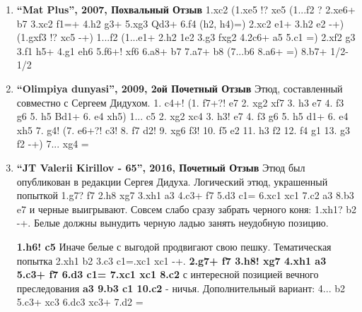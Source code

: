 \begin{enumerate}
\item \textbf{ ``Mat Plus'', 2007, Похвальный Отзыв } 1.\rook{}xc2 (1.\rook{}xe5 !? \rook{}xe5 (1...f2 ? 2.\rook{}xe6+ \king{}b7 3.\rook{}xc2 f1=\queen{}+ 4.\king{}h2 g3+ 5.\king{}xg3 Qd3+ 6.\king{}f4 {(\king{}h2, h4)=}) 2.\rook{}xc2 \rook{}e1+ 3.\king{}h2 \rook{}e2 -+) (1.gxf3 !? \rook{}xc5 -+) 1...f2 (1...\rook{}e1+ 2.\king{}h2 \rook{}1e2 3.\king{}g3 fxg2 4.\rook{}2c6+ \king{}a5 5.\rook{}c1 =) 2.\rook{}xf2 g3 3.\rook{}f1 \rook{}h5+ 4.\king{}g1 \rook{}eh6 5.\rook{}f6+! \rook{}xf6 6.\rook{}a8+ \king{}b7 7.\rook{}a7+ \king{}b8 (7...\king{}b6 8.\rook{}a6+ =) 8.\rook{}b7+ 1/2-1/2

\item \textbf{ ``Olimpiya dunyasi'', 2009, 2ой Почетный Отзыв } Этюд, составленный совместно с Сергеем Дидухом.
1. \knight{}c4+! 
  (1. \knight{}f7+?! \king{}e7 2. \bishop{}xg2 \king{}xf7 3. \bishop{}h3 \knight{}e7 4. \king{}f3 \knight{}g6 5. h5 Bd1+ 6. \king{}e4 \bishop{}xh5) 
1... \king{}c5 2. \bishop{}xg2 \king{}xc4 3. \bishop{}h3! \knight{}e7 4. \king{}f3 \knight{}g6 5. h5 \bishop{}d1+ 6. \king{}e4 \bishop{}xh5 7. \bishop{}g4! 
  (7. \bishop{}e6+?! \king{}c3! 8. \bishop{}f7 \king{}d2! 9. \bishop{}xg6 f3! 10. \bishop{}f5 \king{}e2 11. \bishop{}h3 \king{}f2 12. \king{}f4 \king{}g1 13. \king{}g3 f2 -+) 
7... \bishop{}xg4 =

\item \textbf{ ``JT Valerii Kirillov - 65'', 2016, Почетный Отзыв } Этюд был опубликован в редакции Сергея Дидуха. Логический этюд, украшенный попыткой 1.g7? \king{}f7 2.\rook{}h8 \king{}xg7 3.\rook{}xh1 \bishop{}a3 4.\bishop{}c3+ \king{}f7 5.\king{}d3 c1=\queen{} 6.\rook{}xc1 \bishop{}xc1 7.\king{}c2 \bishop{}a3 8.\king{}b3 \bishop{}e7 и черные выигрывают. Совсем слабо сразу забрать черного коня: 1.\rook{}xh1? \bishop{}b2 -+. Белые должны вынудить черную ладью занять неудобную позицию. 

\textbf{1.\rook{}h6! \rook{}c5} Иначе белые с выгодой продвигают свою пешку. Тематическая попытка 2.\rook{}xh1 \bishop{}b2 3.\bishop{}c3 c1=.\rook{}xc1 \bishop{}xc1 -+. \textbf{ 2.g7+ \king{}f7 3.\rook{}h8! \king{}xg7 4.\rook{}xh1 \bishop{}a3  5.\bishop{}c3+ \king{}f7 6.\king{}d3 c1=\queen{} 7.\rook{}xc1 \bishop{}xc1 8.\king{}c2} с интересной позицией вечного преследования \textbf{ \bishop{}a3 9.\king{}b3 \bishop{}c1 10.\king{}c2 } - ничья. Дополнительный вариант:  4... \bishop{}b2 5.\bishop{}c3+ \bishop{}xc3 6.dc3 \rook{}xc3+ 7.\king{}d2 =

\end{enumerate}